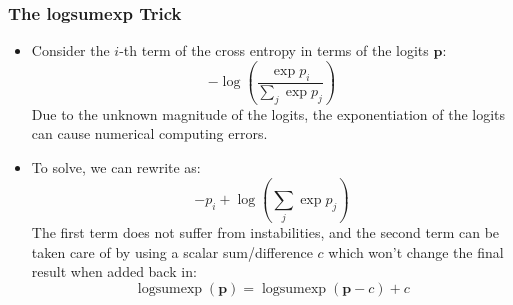 \documentclass{article}
\newcommand{\mbf}[1]{\mathbf{#1}}
\begin{document}
    \subsubsection{The logsumexp Trick}
    \begin{itemize}
        \item Consider the $i$-th term of the cross entropy in terms of the logits $\mbf{p}$:
        \[-\log(\frac{\exp p_i}{\sum_j \exp p_j})\]
        Due to the unknown magnitude of the logits, the exponentiation of the logits can cause numerical computing errors.
        \item To solve, we can rewrite as:
        \[-p_i+\log(\sum_j \exp p_j)\]
        The first term does not suffer from instabilities, and the second term can be taken care of by using a scalar sum/difference 
        $c$ which won't change the final result when added back in:
        \[\operatorname{logsumexp}(\mbf{p})=\operatorname{logsumexp}(\mbf{p}-c)+c\]
    \end{itemize}
\end{document}

